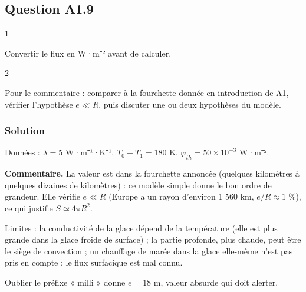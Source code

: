 \documentclass[11pt,a4paper]{article}
\newcommand{\equationajustee}[1]{%
  \sbox{\boiteequation}{$\displaystyle #1$}%
  \ifdim\wd\boiteequation>\linewidth
    \[\resizebox{\linewidth}{!}{\usebox{\boiteequation}}\]%
  \else
    \[#1\]%
  \fi}
\begin{document}
\hypertarget{question-a1.9}{%
\subsection{Question A1.9}\label{question-a1.9}}

\begin{indication}{1}

Convertir le flux en W·m⁻² avant de calculer.

\end{indication}

\begin{indication}{2}

Pour le commentaire : comparer à la fourchette donnée en introduction de A1, vérifier l'hypothèse \(e \ll R\), puis discuter une ou deux hypothèses du modèle.

\end{indication}

\hypertarget{solution-8}{%
\subsubsection{Solution}\label{solution-8}}

Données : \(\lambda = 5\) W·m⁻¹·K⁻¹, \(T_0 - T_1 = 180\) K, \(\varphi_{th} = 50\times10^{-3}\) W·m⁻².

\equationajustee{\begin{aligned}
e &= \frac{5 \times 180}{5{,}0\times10^{-2}} \\
&= 1{,}8\times10^{4}\ \mathrm{m}
\end{aligned}}

\equationajustee{\boxed{e \approx 18\ \mathrm{km}}}

\textbf{Commentaire.} La valeur est dans la fourchette annoncée (quelques kilomètres à quelques dizaines de kilomètres) : ce modèle simple donne le bon ordre de grandeur. Elle vérifie \(e \ll R\) (Europe a un rayon d'environ 1 560 km, \(e/R \approx 1\) \%), ce qui justifie \(S \simeq 4\pi R^2\).

Limites : la conductivité de la glace dépend de la température (elle est plus grande dans la glace froide de surface) ; la partie profonde, plus chaude, peut être le siège de convection ; un chauffage de marée dans la glace elle-même n'est pas pris en compte ; le flux surfacique est mal connu.

\begin{piege}

Oublier le préfixe « milli » donne \(e = 18\) m, valeur absurde qui doit alerter.

\end{piege}
\end{document}
